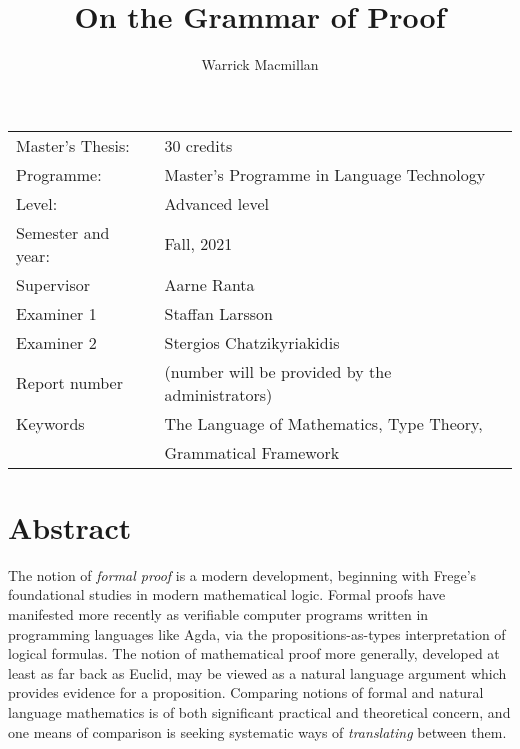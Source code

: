 \documentclass[11pt, a4paper]{article}
\title{On the Grammar of Proof}
\author{Warrick Macmillan}
\begin{document}
\begin{titlepage}

\maketitle

\vfill

\begingroup
\renewcommand*{\arraystretch}{1.2}
\begin{tabular}{l@{\hskip 20mm}l}
\hline
Master's Thesis: & 30 credits\\
Programme: & Master’s Programme in Language Technology\\
Level: & Advanced level \\
Semester and year: & Fall, 2021\\
Supervisor & Aarne Ranta\\
Examiner 1 & Staffan Larsson\\
Examiner 2 & Stergios Chatzikyriakidis \\
Report number & (number will be provided by the administrators) \\
Keywords & The Language of Mathematics, Type Theory, \\
            & Grammatical Framework
\end{tabular}
\endgroup

\thispagestyle{empty}
\end{titlepage}

\newpage
\singlespacing
\section*{Abstract}


The notion of \emph{formal proof} is a modern development, beginning with
Frege's foundational studies in modern mathematical logic. Formal proofs have
manifested more recently as verifiable computer programs written in programming
languages like Agda, via the propositions-as-types interpretation of logical
formulas. The notion of mathematical proof more generally, developed at least as
far back as Euclid, may be viewed as a natural language argument which provides
evidence for a proposition. Comparing notions of formal and natural language
mathematics is of both significant practical and theoretical concern, and one means
of comparison is seeking systematic ways of \emph{translating} between them.
\end{document}

